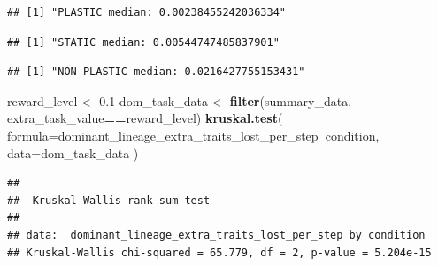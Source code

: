 \documentclass[]{book}
\newenvironment{Shaded}{\begin{snugshade}}{\end{snugshade}}
\newcommand{\DataTypeTok}[1]{\textcolor[rgb]{0.13,0.29,0.53}{#1}}
\newcommand{\FloatTok}[1]{\textcolor[rgb]{0.00,0.00,0.81}{#1}}
\newcommand{\KeywordTok}[1]{\textcolor[rgb]{0.13,0.29,0.53}{\textbf{#1}}}
\newcommand{\NormalTok}[1]{#1}
\newcommand{\OperatorTok}[1]{\textcolor[rgb]{0.81,0.36,0.00}{\textbf{#1}}}
\newcommand{\StringTok}[1]{\textcolor[rgb]{0.31,0.60,0.02}{#1}}
\begin{document}
\begin{verbatim}
## [1] "PLASTIC median: 0.00238455242036334"
\end{verbatim}

\begin{Shaded}
\end{Shaded}

\begin{verbatim}
## [1] "STATIC median: 0.00544747485837901"
\end{verbatim}

\begin{Shaded}
\end{Shaded}

\begin{verbatim}
## [1] "NON-PLASTIC median: 0.0216427755153431"
\end{verbatim}

\begin{Shaded}
\begin{Highlighting}[]
\NormalTok{reward_level <-}\StringTok{ }\FloatTok{0.1}
\NormalTok{dom_task_data <-}\StringTok{ }\KeywordTok{filter}\NormalTok{(summary_data, extra_task_value}\OperatorTok{==}\NormalTok{reward_level)}
\KeywordTok{kruskal.test}\NormalTok{(}
  \DataTypeTok{formula=}\NormalTok{dominant_lineage_extra_traits_lost_per_step}\OperatorTok{~}\NormalTok{condition,}
  \DataTypeTok{data=}\NormalTok{dom_task_data}
\NormalTok{)}
\end{Highlighting}
\end{Shaded}

\begin{verbatim}
## 
##  Kruskal-Wallis rank sum test
## 
## data:  dominant_lineage_extra_traits_lost_per_step by condition
## Kruskal-Wallis chi-squared = 65.779, df = 2, p-value = 5.204e-15
\end{verbatim}
\end{document}
